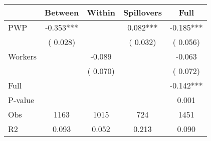 
\begin{tabular}{l*{4}{c}}\hline&\multicolumn{1}{c}{Between}&\multicolumn{1}{c}{Within}&\multicolumn{1}{c}{Spillovers}&\multicolumn{1}{c}{Full}\\ \hline
 PWP           &             -0.353***      &                                               &        0.082*** &        -0.185***                            \\ 
                               &        (       0.028)           &                                       &       (       0.032)     &      (       0.056)                                           \\ 
 Workers       &                                               &       -0.089    &                                &            -0.063                            \\ 
                               &                                               & (       0.070)                  &                                        &      (       0.072)                                           \\ 
\hline                                                                                                                                                                                                                                            
 Full                  &                                               &                                               &                                        &            -0.142***                                     \\ 
 P-value               &                                               &                                               &                                        &             0.001                                           \\ 
 Obs                   &               1163               &       1015                       &       724                &              1451                                               \\ 
 R2                    &                      0.093              &              0.052                      &              0.213               &                     0.090                                              \\ 
\hline \end{tabular}                                                                                                                                                                                                              